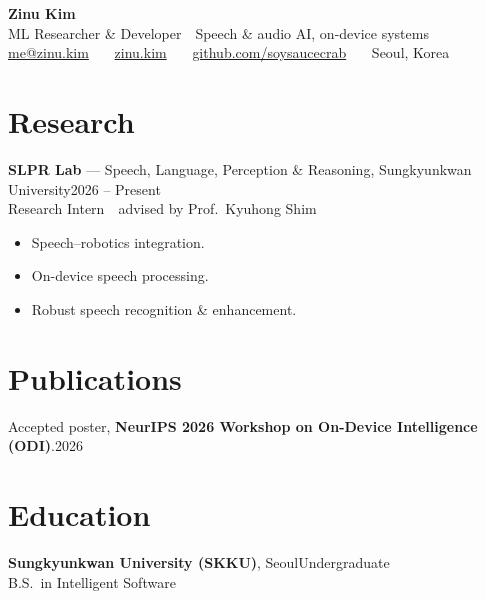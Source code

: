 \documentclass[10pt,a4paper]{article}
\begin{document}
\color{ink}

{\fontsize{26}{30}\selectfont\bfseries Zinu Kim}\\[3pt]
{\color{muted}ML Researcher \& Developer \,\textbullet\, Speech \& audio AI, on-device systems}\\[5pt]
{\small
\href{mailto:me@zinu.kim}{me@zinu.kim} \ \textbullet\ \
\href{https://zinu.kim}{zinu.kim} \ \textbullet\ \
\href{https://github.com/soysaucecrab}{github.com/soysaucecrab} \ \textbullet\ \
Seoul, Korea}

\section{Research}
\textbf{SLPR Lab} — Speech, Language, Perception \& Reasoning, Sungkyunkwan University\hfill{\color{muted}2026 -- Present}\\[1pt]
{\color{muted}Research Intern \,\textbullet\, advised by Prof.\ Kyuhong Shim}
\begin{itemize}[leftmargin=1.1em,itemsep=1pt,topsep=4pt]
  \item Speech--robotics integration.
  \item On-device speech processing.
  \item Robust speech recognition \& enhancement.
\end{itemize}

\section{Publications}
Accepted poster, \textbf{NeurIPS 2026 Workshop on On-Device Intelligence (ODI)}.\hfill{\color{muted}2026}

\section{Education}
\textbf{Sungkyunkwan University (SKKU)}, Seoul\hfill{\color{muted}Undergraduate}\\[1pt]
{\color{muted}B.S.\ in Intelligent Software}

\end{document}
